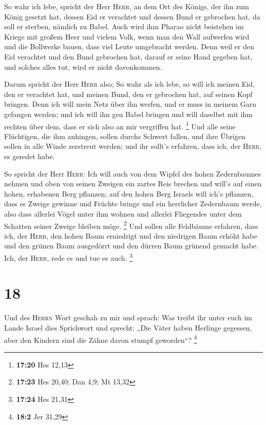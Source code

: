  So wahr ich lebe, spricht der Herr \textsc{Herr}, an dem
Ort des Königs, der ihn zum König gesetzt hat, dessen Eid er verachtet
und dessen Bund er gebrochen hat, da soll er sterben, nämlich zu Babel.
 Auch wird ihm Pharao nicht beistehen im Kriege mit
großem Heer und vielem Volk, wenn man den Wall aufwerfen wird und die
Bollwerke bauen, dass viel Leute umgebracht werden.  Denn
weil er den Eid verachtet und den Bund gebrochen hat, darauf er seine
Hand gegeben hat, und solches alles tut, wird er nicht davonkommen.

 Darum spricht der Herr \textsc{Herr} also; So wahr als
ich lebe, so will ich meinen Eid, den er verachtet hat, und meinen Bund,
den er gebrochen hat, auf seinen Kopf bringen.  Denn ich
will mein Netz über ihn werfen, und er muss in meinem Garn gefangen
werden; und ich will ihn gen Babel bringen und will daselbst mit ihm
rechten über dem, dass er sich also an mir vergriffen hat. \footnote{\textbf{17:20}
  Hes 12,13}  Und alle seine Flüchtigen, die ihm
anhingen, sollen durchs Schwert fallen, und ihre Übrigen sollen in alle
Winde zerstreut werden; und ihr sollt's erfahren, dass ich, der
\textsc{Herr}, es geredet habe.

 So spricht der Herr \textsc{Herr}: Ich will auch von dem
Wipfel des hohen Zedernbaumes nehmen und oben von seinen Zweigen ein
zartes Reis brechen und will's auf einen hohen, erhabenen Berg pflanzen;
 auf den hohen Berg Israels will ich's pflanzen, dass es
Zweige gewinne und Früchte bringe und ein herrlicher Zedernbaum werde,
also dass allerlei Vögel unter ihm wohnen und allerlei Fliegendes unter
dem Schatten seiner Zweige bleiben möge. \footnote{\textbf{17:23} Hes
  20,40; Dan 4,9; Mt 13,32}  Und sollen alle Feldbäume
erfahren, dass ich, der \textsc{Herr}, den hohen Baum erniedrigt und den
niedrigen Baum erhöht habe und den grünen Baum ausgedörrt und den dürren
Baum grünend gemacht habe. Ich, der \textsc{Herr}, rede es und tue es
auch. \footnote{\textbf{17:24} Hes 21,31}

\hypertarget{section-5}{%
\section{18}\label{section-5}}

 Und des \textsc{Herrn} Wort geschah zu mir und sprach:
 Was treibt ihr unter euch im Lande Israel dies Sprichwort
und sprecht: „Die Väter haben Herlinge gegessen, aber den Kindern sind
die Zähne davon stumpf geworden``? \footnote{\textbf{18:2} Jer 31,29}

